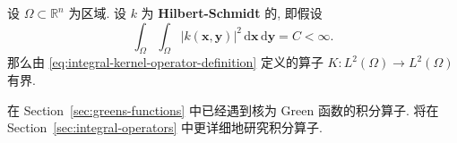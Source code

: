 \begin{Lemma}
\label{lem:hilbert-schmidt-kernel-boundedness}
设 $\Omega\subset\mathbb{R}^n$ 为区域. 设 $k$ 为 \textbf{Hilbert-Schmidt} 的, 即假设
\begin{equation}\label{eq:hilbert-schmidt-kernel-square-integrability}
\int_{\Omega}\int_{\Omega}|k(\bm{x},\bm{y})|^2\,\mathrm{d}\bm{x}\,\mathrm{d}\bm{y}=C<\infty.
\end{equation}
那么由 \eqref{eq:integral-kernel-operator-definition} 定义的算子 $K:L^2(\Omega)\to L^2(\Omega)$ 有界.
\end{Lemma}

\begingroup
{}
\renewcommand{\endProof}{\par\nobreak\hfill$\blacksquare$\par\vspace{0.1cm}}
\endgroup

在 Section~\ref{sec:greens-functions} 中已经遇到核为 Green 函数的积分算子. 将在 Section~\ref{sec:integral-operators} 中更详细地研究积分算子.
